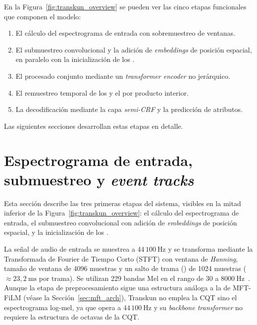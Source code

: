 \documentclass[11pt,spanish,listoffigures,listoftables]{tfgetsinf}
\begin{document}
\clearpage

En la Figura~\ref{fig:transkun_overview} se pueden ver las cinco etapas funcionales que componen el modelo:

\begin{enumerate}
  \item El cálculo del espectrograma de entrada con sobremuestreo de ventanas.
  \item El submuestreo convolucional y la adición de \textit{embeddings} de
        posición espacial, en paralelo con la inicialización de los
        .
  \item El procesado conjunto mediante un \textit{transformer encoder} no
        jerárquico.
  \item El remuestreo temporal de los  y el
         por producto interior.
  \item La decodificación mediante la capa \textit{semi-CRF} y la predicción de
        atributos.
\end{enumerate}

Las siguientes secciones desarrollan estas etapas en detalle.

\section{Espectrograma de entrada, submuestreo y \textit{event tracks}}
\label{sec:transkun_input}

Esta sección describe las tres primeras etapas del sistema, visibles en la mitad
inferior de la Figura~\ref{fig:transkun_overview}: el cálculo del espectrograma
de entrada, el submuestreo convolucional con adición de \textit{embeddings} de posición
espacial, y la inicialización de los .

La señal de audio de entrada se muestrea a $44\,100~\mathrm{Hz}$ y se transforma
mediante la Transformada de Fourier de Tiempo Corto (STFT) con ventana de \textit{Hanning},
tamaño de ventana de 4096 muestras y un salto de trama
() de 1024 muestras ($\approx 23{,}2~\mathrm{ms}$ por
trama). Se utilizan 229 bandas Mel en el rango de 30 a
$8000~\mathrm{Hz}$~\cite{yan2024transkun}. Aunque la etapa de preprocesamiento sigue una estructura análoga a la de MFT-FiLM (véase la
Sección~\ref{sec:mft_arch}), Transkun no emplea la CQT sino el espectrograma
log-mel, ya que opera a $44\,100~\mathrm{Hz}$ y su \textit{backbone transformer} no
requiere la estructura de octavas de la CQT.
\end{document}
